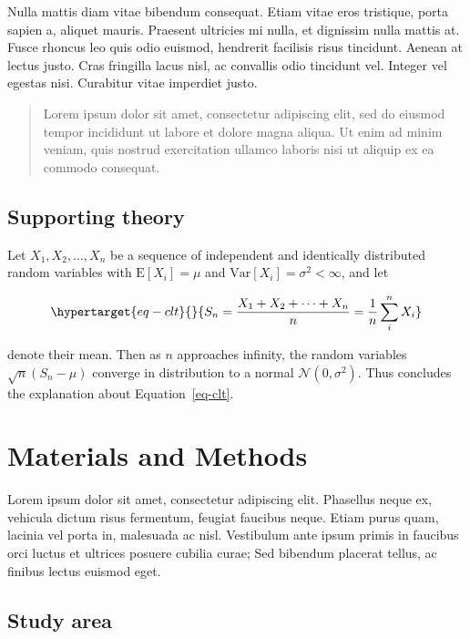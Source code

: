 \documentclass[
  oneside,
  open=any]{scrbook}
\begin{document}
Nulla mattis diam vitae bibendum consequat. Etiam vitae eros tristique,
porta sapien a, aliquet mauris. Praesent ultricies mi nulla, et
dignissim nulla mattis at. Fusce rhoncus leo quis odio euismod,
hendrerit facilisis risus tincidunt. Aenean at lectus justo. Cras
fringilla lacus nisl, ac convallis odio tincidunt vel. Integer vel
egestas nisi. Curabitur vitae imperdiet justo.

\begin{quote}
Lorem ipsum dolor sit amet, consectetur adipiscing elit, sed do eiusmod
tempor incididunt ut labore et dolore magna aliqua. Ut enim ad minim
veniam, quis nostrud exercitation ullamco laboris nisi ut aliquip ex ea
commodo consequat.\\
\end{quote}

\hypertarget{supporting-theory}{%
\section{Supporting theory}\label{supporting-theory}}

Let \(X_1, X_2, \ldots, X_n\) be a sequence of independent and
identically distributed random variables with \(\text{E}[X_i] = \mu\)
and \(\text{Var}[X_i] = \sigma^2 < \infty\), and let

\begin{equation}\protect\hypertarget{eq-clt}{}{
S_n = \frac{X_1 + X_2 + \cdots + X_n}{n}
      = \frac{1}{n}\sum_{i}^{n} X_i
}\label{eq-clt}\end{equation}

denote their mean. Then as \(n\) approaches infinity, the random
variables \(\sqrt{n}(S_n - \mu)\) converge in distribution to a normal
\(\mathcal{N}(0, \sigma^2)\). Thus concludes the explanation about
Equation~\ref{eq-clt}.

\hypertarget{materials-and-methods}{%
\chapter{Materials and Methods}\label{materials-and-methods}}

Lorem ipsum dolor sit amet, consectetur adipiscing elit. Phasellus neque
ex, vehicula dictum risus fermentum, feugiat faucibus neque. Etiam purus
quam, lacinia vel porta in, malesuada ac nisl. Vestibulum ante ipsum
primis in faucibus orci luctus et ultrices posuere cubilia curae; Sed
bibendum placerat tellus, ac finibus lectus euismod eget.

\hypertarget{study-area}{%
\section{Study area}\label{study-area}}
\end{document}
